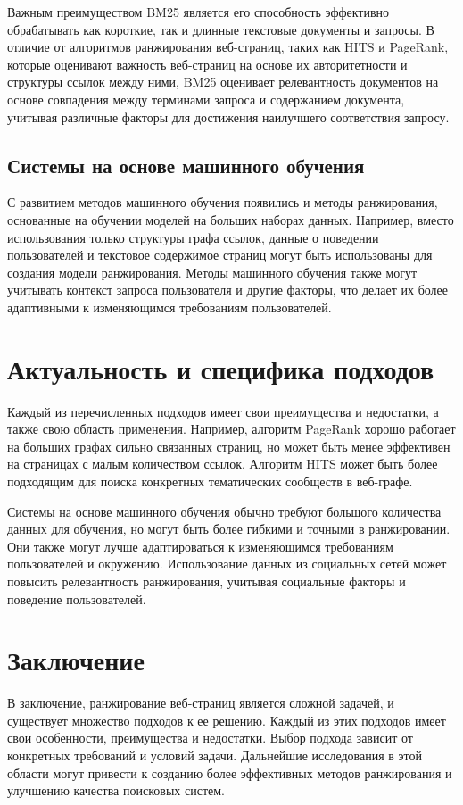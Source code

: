 \documentclass[a4paper]{article}
\begin{document}
			Важным преимуществом BM25 является его способность эффективно обрабатывать как короткие, так и длинные текстовые документы и запросы. В отличие от алгоритмов ранжирования веб-страниц, таких как HITS и PageRank, которые оценивают важность веб-страниц на основе их авторитетности и структуры ссылок между ними, BM25 оценивает релевантность документов на основе совпадения между терминами запроса и содержанием документа, учитывая различные факторы для достижения наилучшего соответствия запросу.
	\newpage
	\subsection{Системы на основе машинного обучения}
		С развитием методов машинного обучения появились и методы ранжирования, основанные на обучении моделей на больших наборах данных. Например, вместо использования только структуры графа ссылок, данные о поведении пользователей и текстовое содержимое страниц могут быть использованы для создания модели ранжирования. Методы машинного обучения также могут учитывать контекст запроса пользователя и другие факторы, что делает их более адаптивными к изменяющимся требованиям пользователей.
	\section{Актуальность и специфика подходов}
		Каждый из перечисленных подходов имеет свои преимущества и недостатки, а также свою область применения. Например, алгоритм PageRank хорошо работает на больших графах сильно связанных страниц, но может быть менее эффективен на страницах с малым количеством ссылок. Алгоритм HITS может быть более подходящим для поиска конкретных тематических сообществ в веб-графе.
		
		Системы на основе машинного обучения обычно требуют большого количества данных для обучения, но могут быть более гибкими и точными в ранжировании. Они также могут лучше адаптироваться к изменяющимся требованиям пользователей и окружению. Использование данных из социальных сетей может повысить релевантность ранжирования, учитывая социальные факторы и поведение пользователей.	
	\section{Заключение}
		В заключение, ранжирование веб-страниц является сложной задачей, и существует множество подходов к ее решению. Каждый из этих подходов имеет свои особенности, преимущества и недостатки. Выбор подхода зависит от конкретных требований и условий задачи. Дальнейшие исследования в этой области могут привести к созданию более эффективных методов ранжирования и улучшению качества поисковых систем.
	\newpage
\end{document}
